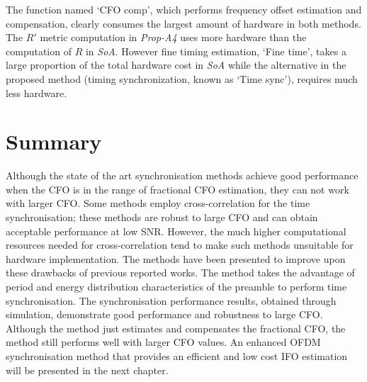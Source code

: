 The function named `CFO comp', which performs frequency offset estimation and compensation, clearly consumes the largest amount of hardware in both methods.
The $R'$ metric computation in \textit{Prop-A4} uses more hardware than the computation of $R$ in \textit{SoA}. However fine timing estimation, `Fine time', takes a large proportion of the total hardware cost in \textit{SoA} while the alternative in the proposed method (timing synchronization, known as `Time sync'), requires much less hardware.

\section{Summary}

Although the state of the art synchronisation methods achieve good performance when the CFO is in the range of fractional CFO estimation, they can not work with larger CFO. 
Some methods employ cross-correlation for the time synchronisation; these methods are robust to large CFO and can obtain acceptable performance at low SNR.
However, the much higher computational resources needed for cross-correlation tend to make such methods unsuitable for hardware implementation.
The methods have been presented to improve upon these drawbacks of previous reported works. 
The method takes the advantage of period and energy distribution characteristics of the preamble to perform time synchronisation. 
The synchronisation performance results, obtained through simulation, demonstrate good performance and robustness to large CFO.
Although the method just estimates and compensates the fractional CFO, the method still performs well with larger CFO values. 
An enhanced OFDM synchronisation method that provides an efficient and low cost IFO estimation will be presented in the next chapter.
